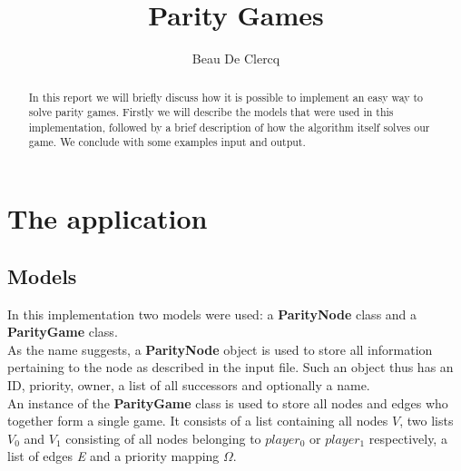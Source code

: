 \documentclass[12pt]{article}
\title{Parity Games}
\author{Beau De Clercq}
\begin{document}
\maketitle{}



\begin{abstract}
	In this report we will briefly discuss how it is possible to implement an easy way to solve parity games. Firstly we will describe the models that were used in this implementation, followed by a brief description of how the algorithm itself solves our game. We conclude with some examples input and output.
\end{abstract}

\section{The application}
\subsection{Models}
In this implementation two models were used: a \textbf{ParityNode} class and a \textbf{ParityGame} class. \\
As the name suggests, a \textbf{ParityNode} object is used to store all information pertaining to the node as described in the input file. Such an object thus has an ID, priority, owner, a list of all successors and optionally a name.\\ 
An instance of the \textbf{ParityGame} class is used to store all nodes and edges who together form a single game. It consists of a list containing all nodes \textit{$V$}, two lists \textit{$V_0$} and \textit{$V_1$} consisting of all nodes belonging to $player_0$ or $player_1$ respectively, a list of edges \textit{E} and a priority mapping $\Omega$.\\
\end{document}
